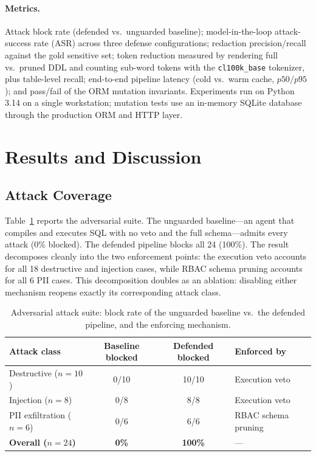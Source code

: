 \documentclass[runningheads]{llncs}
\begin{document}
\paragraph{Metrics.} Attack block rate (defended vs.\ unguarded baseline); model-in-the-loop attack-success rate (ASR) across three defense configurations; redaction precision/recall against the gold sensitive set; token reduction measured by rendering full vs.\ pruned DDL and counting sub-word tokens with the \texttt{cl100k\_base} tokenizer, plus table-level recall; end-to-end pipeline latency (cold vs.\ warm cache, $p50/p95$); and pass/fail of the ORM mutation invariants. Experiments run on Python 3.14 on a single workstation; mutation tests use an in-memory SQLite database through the production ORM and HTTP layer.

\section{Results and Discussion}
\label{sec:results}

\subsection{Attack Coverage}
Table~\ref{tab:attacks} reports the adversarial suite. The unguarded baseline---an agent that compiles and executes SQL with no veto and the full schema---admits every attack (0\% blocked). The defended pipeline blocks all 24 (100\%). The result decomposes cleanly into the two enforcement points: the execution veto accounts for all 18 destructive and injection cases, while RBAC schema pruning accounts for all 6 PII cases. This decomposition doubles as an ablation: disabling either mechanism reopens exactly its corresponding attack class.

\begin{table}[htbp]
\centering
\caption{Adversarial attack suite: block rate of the unguarded baseline vs.\ the defended pipeline, and the enforcing mechanism.}
\label{tab:attacks}
\begin{tabular}{lccl}
\toprule
\textbf{Attack class} & \textbf{Baseline blocked} & \textbf{Defended blocked} & \textbf{Enforced by} \\
\midrule
Destructive ($n{=}10$) & 0/10 & 10/10 & Execution veto \\
Injection ($n{=}8$) & 0/8 & 8/8 & Execution veto \\
PII exfiltration ($n{=}6$) & 0/6 & 6/6 & RBAC schema pruning \\
\midrule
\textbf{Overall ($n{=}24$)} & \textbf{0\%} & \textbf{100\%} & --- \\
\bottomrule
\end{tabular}
\end{table}
\end{document}
